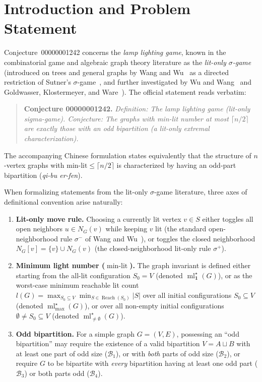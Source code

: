\documentclass[11pt,a4paper]{article}
\theoremstyle{definition}
\newcommand{\ml}{\operatorname{ml}}
\newcommand{\Reach}{\operatorname{Reach}}
\newcommand{\ceilhalf}[1]{\lceil #1 / 2 \rceil}
\begin{document}
\section{Introduction and Problem Statement}

Conjecture~00000001242 concerns the \emph{lamp lighting game}, known in the
combinatorial game and algebraic graph theory literature as the \emph{lit-only
$\sigma$-game} (introduced on trees and general graphs by Wang and Wu~\cite{WangWu2006}
as a directed restriction of Sutner's $\sigma$-game~\cite{Sutner1989}, and further
investigated by Wu and Wang~\cite{WuWang2008} and Goldwasser, Klostermeyer, and
Ware~\cite{GKW2009}). The official statement reads verbatim:

\begin{quote}
\textbf{Conjecture 00000001242.}
\emph{Definition: The lamp lighting game (lit-only sigma-game). Conjecture: The
graphs with min-lit number at most $\lceil n/2 \rceil$ are exactly those with an
odd bipartition (a lit-only extremal characterization).}
\end{quote}

The accompanying Chinese formulation states equivalently that the structure of
$n$-vertex graphs with $\text{min-lit} \le \ceilhalf{n}$ is characterized by having
an odd-part bipartition (\emph{qi-bu er-fen}).

When formalizing statements from the lit-only $\sigma$-game literature, three
axes of definitional convention arise naturally:
\begin{enumerate}
\item[(A)] \textbf{Lit-only move rule.} Choosing a currently lit vertex $v \in S$
either toggles all open neighbors $u \in N_G(v)$ while keeping $v$ lit (the
standard open-neighborhood rule $\sigma^-$ of Wang and Wu~\cite{WangWu2006}), or
toggles the closed neighborhood $N_G[v] = \{v\} \cup N_G(v)$ (the closed-neighborhood
lit-only rule $\sigma^+$).
\item[(B)] \textbf{Minimum light number ($\operatorname{min-lit}$).} The graph invariant
is defined either starting from the all-lit configuration $S_0 = V$ (denoted
$\ml_{\mathbf{1}}^\star(G)$), or as the worst-case minimum reachable lit count
$l(G) = \max_{S_0 \subseteq V} \min_{S \in \Reach(S_0)} |S|$ over all initial
configurations $S_0 \subseteq V$ (denoted $\ml_{\max}^\star(G)$), or over all
non-empty initial configurations $\emptyset \neq S_0 \subseteq V$ (denoted
$\ml_{\neq\emptyset}^\star(G)$).
\item[(C)] \textbf{Odd bipartition.} For a simple graph $G = (V, E)$, possessing an
``odd bipartition'' may require the existence of a valid bipartition $V = A \sqcup B$
with at least one part of odd size ($\mathcal{B}_1$), or with \emph{both} parts of
odd size ($\mathcal{B}_2$), or require $G$ to be bipartite with \emph{every}
bipartition having at least one odd part ($\mathcal{B}_3$) or both parts odd
($\mathcal{B}_4$).
\end{enumerate}
\end{document}
